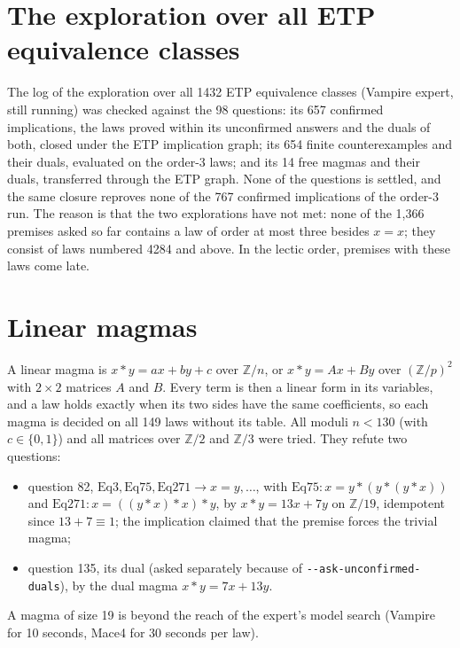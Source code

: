 \documentclass[11pt,a4paper]{article}
\newcommand{\code}[1]{\texttt{#1}}
\newcommand{\Eq}[1]{\mathrm{Eq}#1}
\newcommand{\Z}{\mathbb{Z}}
\begin{document}
\section{The exploration over all ETP equivalence classes}

The log of the exploration over all 1432 ETP equivalence classes (Vampire expert, still running)
was checked against the 98 questions: its 657 confirmed implications, the laws proved within its
unconfirmed answers and the duals of both, closed under the ETP implication graph; its 654 finite
counterexamples and their duals, evaluated on the order-3 laws; and its 14 free magmas and their
duals, transferred through the ETP graph. None of the questions is settled, and the same closure
reproves none of the 767 confirmed implications of the order-3 run. The reason is that the two
explorations have not met: none of the 1,366 premises asked so far contains a law of order at most
three besides $x = x$; they consist of laws numbered 4284 and above. In the lectic order, premises
with these laws come late.

\section{Linear magmas}

A linear magma is $x * y = a x + b y + c$ over $\Z/n$, or $x * y = A x + B y$ over $(\Z/p)^2$ with
$2 \times 2$ matrices $A$ and $B$. Every term is then a linear form in its variables, and a law holds
exactly when its two sides have the same coefficients, so each magma is decided on all 149 laws
without its table. All moduli $n < 130$ (with $c \in \{0, 1\}$) and all matrices over $\Z/2$ and
$\Z/3$ were tried. They refute two questions:

\begin{itemize}
  \item question 82, $\Eq{3}, \Eq{75}, \Eq{271} \to x = y, \dots$, with
        $\Eq{75}\colon x = y * (y * (y * x))$ and $\Eq{271}\colon x = ((y * x) * x) * y$,
        by $x * y = 13x + 7y$ on $\Z/19$, idempotent since $13 + 7 \equiv 1$;
        the implication claimed that the premise forces the trivial magma;
  \item question 135, its dual (asked separately because of \code{-{}-ask-unconfirmed-duals}),
        by the dual magma $x * y = 7x + 13y$.
\end{itemize}
A magma of size 19 is beyond the reach of the expert's model search (Vampire for 10 seconds, Mace4 for
30 seconds per law).
\end{document}
